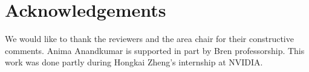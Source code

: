\documentclass{article}
\theoremstyle{plain}
\theoremstyle{definition}
\theoremstyle{remark}
\begin{document}
\printAffiliationsAndNotice{}  %
















\section*{Acknowledgements}
We would like to thank the reviewers and the area chair for their constructive comments. Anima Anandkumar is supported in part by Bren professorship. This work was done partly during Hongkai Zheng's internship at NVIDIA.






\nocite{langley00}





\newpage
\appendix
\onecolumn


\end{document}
